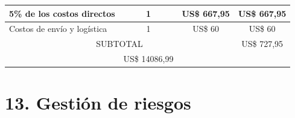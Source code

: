 \documentclass[
11pt, %
]{charter}
\begin{document}
\begin{table}[htpb]
\begin{tabularx}{\linewidth}{@{}|X|c|r|r|@{}}
5\% de los costos directos &
\multicolumn{1}{c|}{1} &
\multicolumn{1}{c|}{US\$ 667,95} &
\multicolumn{1}{c|}{US\$ 667,95} \\ \hline

Costos de envío y logística &
\multicolumn{1}{c|}{1} &
\multicolumn{1}{c|}{US\$ 60} &
\multicolumn{1}{c|}{US\$ 60} \\ \hline

\multicolumn{3}{|c|}{SUBTOTAL} &
  \multicolumn{1}{c|}{US\$ 727,95} \\ \hline
\rowcolor[HTML]{C0C0C0}
\multicolumn{3}{|c|}{TOTAL} & \multicolumn{1}{c|}{US\$ 14086,99}
   \\ \hline
\end{tabularx}%
\end{table}


\section{13. Gestión de riesgos}
\label{sec:riesgos}
\end{document}
